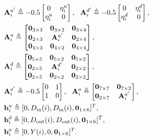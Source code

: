 \documentclass[10pt,journal,compsoc]{IEEEtran}
\begin{document}
\begin{align}
&\mathbf{A}^{u'}_i\triangleq -0.5
\begin{bmatrix}
0&\eta^{u}_i\\
\eta^{u}_i&0\\
\end{bmatrix},\ \ \nonumber\allowdisplaybreaks
\mathbf{A}^{d'}_i\triangleq -0.5
\begin{bmatrix}
0&\eta^{d}_i\\
\eta^{d}_i&0\\
\end{bmatrix},\nonumber\allowdisplaybreaks\\
&\mathbf{A}^u_i\triangleq
\begin{bmatrix}
\mathbf{0}_{3\times 3}&\mathbf{0}_{3\times 2}&\mathbf{0}_{3\times 4}\\
\mathbf{0}_{2\times 3}&\mathbf{A}^{u'}_i&\mathbf{0}_{2\times 4}\\
\mathbf{0}_{4\times 3}&\mathbf{0}_{4\times 2}&\mathbf{0}_{4\times 4}\\
\end{bmatrix},\nonumber\allowdisplaybreaks\\
&\mathbf{A}^d_i\triangleq
\begin{bmatrix}
\mathbf{0}_{5\times 5}&\mathbf{0}_{5\times 2}&\mathbf{0}_{5\times 2}\\
\mathbf{0}_{2\times 5}&\mathbf{A}^{d'}_i&\mathbf{0}_{2\times 2}\\
\mathbf{0}_{2\times 5}&\mathbf{0}_{2\times 2}&\mathbf{0}_{2\times 2}\\
\end{bmatrix},\nonumber\allowdisplaybreaks\\
&\mathbf{A}^{a'}_i\triangleq -0.5
\begin{bmatrix}
0&1\\
1&0\\
\end{bmatrix},\ \ \nonumber\allowdisplaybreaks
\mathbf{A}^a_i\triangleq
\begin{bmatrix}
\mathbf{0}_{7\times 7}&\mathbf{0}_{7\times 2}\\
\mathbf{0}_{2\times 7}&\mathbf{A}^{a'}_i\\
\end{bmatrix},\nonumber\allowdisplaybreaks\\
&\mathbf{b}^u_i\triangleq[0,D_{\textrm{in}}(i),D_{\textrm{in}}(i), \mathbf{0}_{1\times 6}]^T,\nonumber\\
&\mathbf{b}^d_i\triangleq[0,D_{\textrm{out}}(i),D_{\textrm{out}}(i), \mathbf{0}_{1\times 6}]^T,\nonumber\\
&\mathbf{b}^a_i\triangleq[0,Y(i),0, \mathbf{0}_{1\times
6}]^T.\nonumber\allowdisplaybreaks
\end{align}
\end{document}
